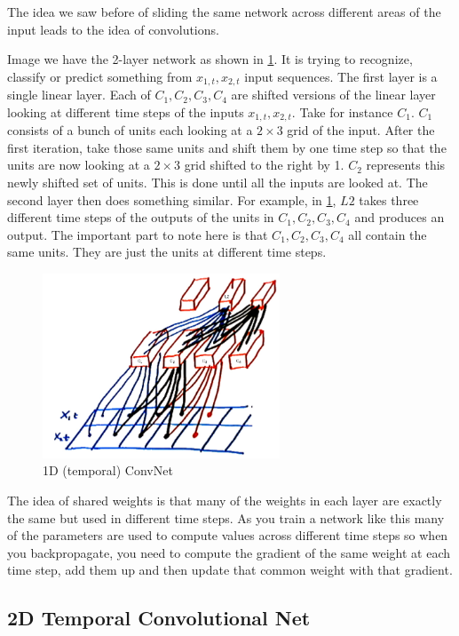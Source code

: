 The idea we saw before of sliding the same network across different areas of the input leads to the idea of convolutions. 

Image we have the 2-layer network as shown in \cref{fig:2layer}. 
It is trying to recognize, classify or predict something from $x_{1,t}, x_{2,t}$ input sequences. 
The first layer is a single linear layer. 
Each of $C_{1}, C_{2}, C_{3}, C_{4}$ are shifted versions of the linear layer looking at different time steps of the inputs $x_{1,t}, x_{2,t}$. 
Take for instance $C_{1}$.
$C_{1}$ consists of a bunch of units each looking at a $2\times 3$ grid of the input.
After the first iteration, take those same units and shift them by one time step so that the units are now looking at a $2\times 3$ grid shifted to the right by 1.
$C_{2}$ represents this newly shifted set of units.
This is done until all the inputs are looked at.
The second layer then does something similar.
For example, in \cref{fig:2layer}, $L2$ takes three different time steps of the outputs of the units in $C_{1}, C_{2}, C_{3}, C_{4}$ and produces an output.
The important part to note here is that $C_{1}, C_{2}, C_{3}, C_{4}$ all contain the same units.
They are just the units at different time steps.

\begin{figure}
    \centering
    \includegraphics[width=200pt]{figs/conv_net.png}
    \caption{1D (temporal) ConvNet}
    \label{fig:2layer}
\end{figure}

The idea of shared weights is that many of the weights in each layer are exactly the same but used in different time steps. 
As you train a network like this many of the parameters are used to compute values across different time steps so when you backpropagate, you need to compute the gradient of the same weight at each time step, add them up and then update that common weight with that gradient.

\subsection{2D Temporal Convolutional Net}


